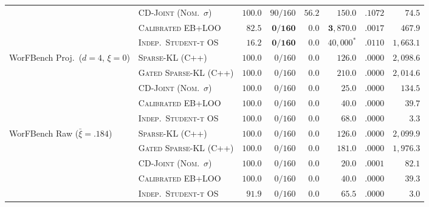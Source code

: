 \documentclass{article}
\theoremstyle{plain}
\theoremstyle{definition}
\begin{document}
\begin{table}[!htbp]
{\begin{tabular}{@{}llrrrrrr@{}}
 & \textsc{CD-Joint (Nom.\ $\sigma$)} & $100.0$ & $90/160$ & $56.2$ & $150.0$ & $.1072$ & $74.5$ \\
 & \textsc{Calibrated EB+LOO} & $\mathbf{82.5}$ & $\mathbf{0/160}$ & $\mathbf{0.0}$ & $\mathbf{3{,}870.0}$ & $\mathbf{.0017}$ & $467.9$ \\
 & \textsc{Indep.\ Student-t OS} & $16.2$ & $\mathbf{0/160}$ & $\mathbf{0.0}$ & $40{,}000^*$ & $.0110$ & $1{,}663.1$ \\
\midrule
\multirow{5}{*}{WorFBench Proj.\ ($d{=}4$, $\xi{=}0$)}
 & \textsc{Sparse-KL (C++)} & $100.0$ & $0/160$ & $0.0$ & $126.0$ & $.0000$ & $2{,}098.6$ \\
 & \textsc{Gated Sparse-KL (C++)} & $100.0$ & $0/160$ & $0.0$ & $210.0$ & $.0000$ & $2{,}014.6$ \\
 & \textsc{CD-Joint (Nom.\ $\sigma$)} & $100.0$ & $0/160$ & $0.0$ & $25.0$ & $.0000$ & $134.5$ \\
 & \textsc{Calibrated EB+LOO} & $100.0$ & $0/160$ & $0.0$ & $\mathbf{40.0}$ & $.0000$ & $39.7$ \\
 & \textsc{Indep.\ Student-t OS} & $100.0$ & $0/160$ & $0.0$ & $68.0$ & $.0000$ & $3.3$ \\
\midrule
\multirow{5}{*}{WorFBench Raw ($\bar\xi{=}.184$)}
 & \textsc{Sparse-KL (C++)} & $100.0$ & $0/160$ & $0.0$ & $126.0$ & $.0000$ & $2{,}099.9$ \\
 & \textsc{Gated Sparse-KL (C++)} & $100.0$ & $0/160$ & $0.0$ & $181.0$ & $.0000$ & $1{,}976.3$ \\
 & \textsc{CD-Joint (Nom.\ $\sigma$)} & $100.0$ & $0/160$ & $0.0$ & $20.0$ & $.0001$ & $82.1$ \\
 & \textsc{Calibrated EB+LOO} & $100.0$ & $0/160$ & $0.0$ & $\mathbf{40.0}$ & $.0000$ & $39.3$ \\
 & \textsc{Indep.\ Student-t OS} & $91.9$ & $0/160$ & $0.0$ & $65.5$ & $.0000$ & $3.0$ \\
\bottomrule
\end{tabular}%
}
\end{table}
\end{document}
